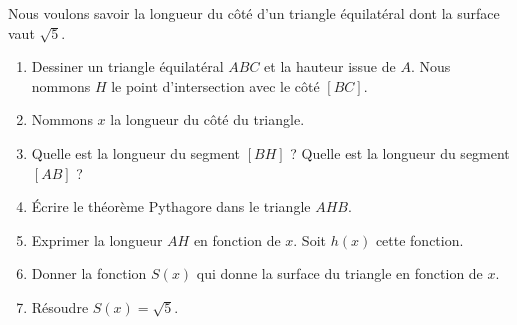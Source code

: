 
\begin{exercice}\label{exoSeconde-0063}

    Nous voulons savoir la longueur du côté d'un triangle équilatéral dont la surface vaut \( \sqrt{5}\).
    \begin{enumerate}
        \item
            Dessiner un triangle équilatéral \( ABC\) et la hauteur issue de \( A\). Nous nommons \( H\) le point d'intersection avec le côté \( [BC]\).
        \item
            Nommons \( x\) la longueur du côté du triangle.
        \item
            Quelle est la longueur du segment \( [BH]\) ? Quelle est la longueur du segment \( [AB]\) ?
        \item
            Écrire le théorème Pythagore dans le triangle \( AHB\).
        \item
            Exprimer la longueur \( AH\) en fonction de \( x\). Soit \( h(x)\) cette fonction.
        \item
            Donner la fonction \( S(x)\) qui donne la surface du triangle en fonction de \( x\).
        \item
            Résoudre \( S(x)=\sqrt{5}\).
    \end{enumerate}

\end{exercice}
